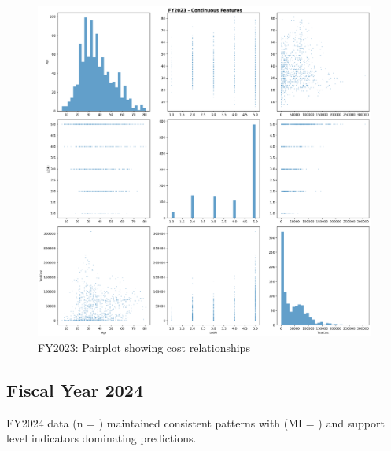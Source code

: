\newpage

\vspace*{\fill}
\begin{figure}[htbp]
\centering
\includegraphics[width=\textwidth]{fy2023_pairplot_top_features.png}
\caption{FY2023: Pairplot showing cost relationships}
\end{figure}
\vspace*{\fill}

\newpage

\subsection{Fiscal Year 2024}

FY2024 data (n = \FSRecordsFinalFYTwoThousandTwentyFour) maintained consistent patterns with \FSTopFeatureFYTwoThousandTwentyFour{} (MI = \FSTopMIFYTwoThousandTwentyFour) and support level indicators dominating predictions.

